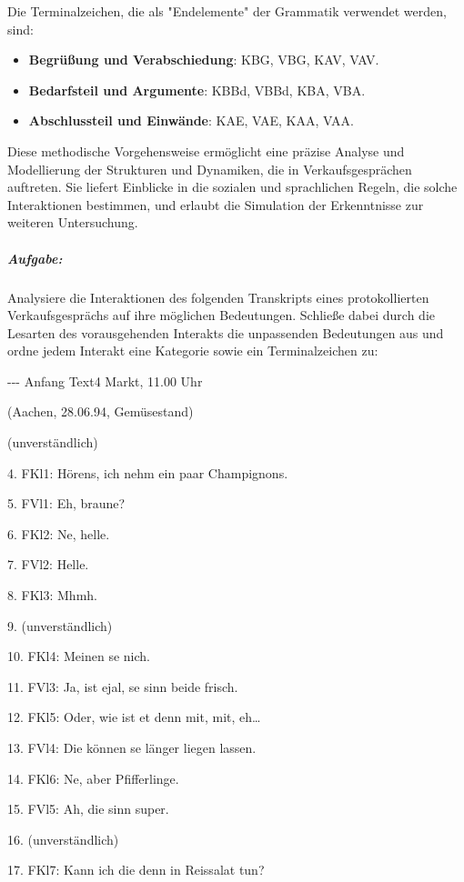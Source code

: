 \documentclass[
]{article}
\begin{document}
Die Terminalzeichen, die als "Endelemente" der Grammatik verwendet
werden, sind:

\begin{itemize}
\item
  \textbf{Begrüßung und Verabschiedung}: KBG, VBG, KAV, VAV.
\item
  \textbf{Bedarfsteil und Argumente}: KBBd, VBBd, KBA, VBA.
\item
  \textbf{Abschlussteil und Einwände}: KAE, VAE, KAA, VAA.
\end{itemize}

Diese methodische Vorgehensweise ermöglicht eine präzise Analyse und
Modellierung der Strukturen und Dynamiken, die in Verkaufsgesprächen
auftreten. Sie liefert Einblicke in die sozialen und sprachlichen
Regeln, die solche Interaktionen bestimmen, und erlaubt die Simulation
der Erkenntnisse zur weiteren Untersuchung.

\subparagraph{\texorpdfstring{\textbf{Aufgabe:}}{Aufgabe:}}\label{aufgabe}

Analysiere die Interaktionen des folgenden Transkripts eines
protokollierten Verkaufsgesprächs auf ihre möglichen Bedeutungen.
Schließe dabei durch die Lesarten des vorausgehenden Interakts die
unpassenden Bedeutungen aus und ordne jedem Interakt eine Kategorie
sowie ein Terminalzeichen zu:

-\/-\/- Anfang Text4 Markt, 11.00 Uhr

(Aachen, 28.06.94, Gemüsestand)

(unverständlich)

4. FKl1: Hörens, ich nehm ein paar Champignons.

5. FVl1: Eh, braune?

6. FKl2: Ne, helle.

7. FVl2: Helle.

8. FKl3: Mhmh.

9. (unverständlich)

10. FKl4: Meinen se nich.

11. FVl3: Ja, ist ejal, se sinn beide frisch.

12. FKl5: Oder, wie ist et denn mit, mit, eh\ldots{}

13. FVl4: Die können se länger liegen lassen.

14. FKl6: Ne, aber Pfifferlinge.

15. FVl5: Ah, die sinn super.

16. (unverständlich)

17. FKl7: Kann ich die denn in Reissalat tun?
\end{document}
